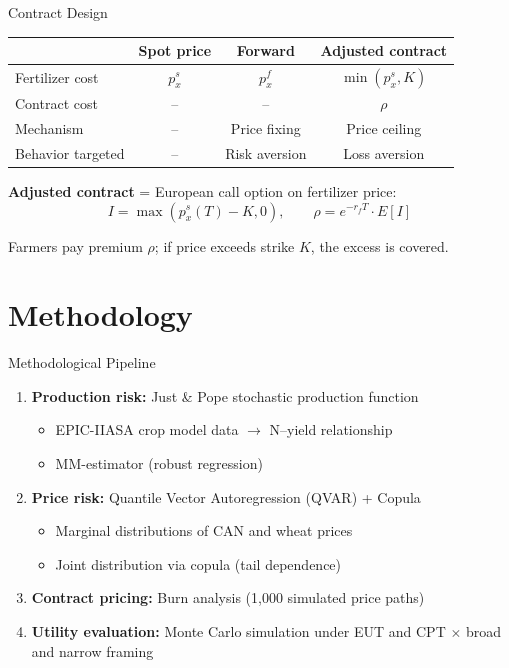\documentclass[aspectratio=169,12pt]{beamer}
\begin{document}
\begin{frame}{Contract Design}
\begin{table}
\centering
\small
\begin{tabular}{lccc}
\toprule
 & Spot price & Forward & Adjusted contract \\
\midrule
Fertilizer cost & $p_x^s$ & $p_x^f$ & $\min(p_x^s, K)$ \\
Contract cost & -- & -- & $\rho$ \\
Mechanism & -- & Price fixing & Price ceiling \\
Behavior targeted & -- & Risk aversion & Loss aversion \\
\bottomrule
\end{tabular}
\end{table}

\vspace{0.5em}
\textbf{Adjusted contract} = European call option on fertilizer price:
\begin{equation*}
I = \max(p_x^s(T) - K, 0), \qquad \rho = e^{-r_f T} \cdot E[I]
\end{equation*}

Farmers pay premium $\rho$; if price exceeds strike $K$, the excess is covered.
\end{frame}

\section{Methodology}

\begin{frame}{Methodological Pipeline}
\begin{enumerate}
    \item \textbf{Production risk:} Just \& Pope stochastic production function
    \begin{itemize}
        \item EPIC-IIASA crop model data $\rightarrow$ N--yield relationship
        \item MM-estimator (robust regression)
    \end{itemize}
    \vspace{0.3em}
    \item \textbf{Price risk:} Quantile Vector Autoregression (QVAR) + Copula
    \begin{itemize}
        \item Marginal distributions of CAN and wheat prices
        \item Joint distribution via copula (tail dependence)
    \end{itemize}
    \vspace{0.3em}
    \item \textbf{Contract pricing:} Burn analysis (1,000 simulated price paths)
    \vspace{0.3em}
    \item \textbf{Utility evaluation:} Monte Carlo simulation under EUT and CPT $\times$ broad and narrow framing
\end{enumerate}
\end{frame}
\end{document}
